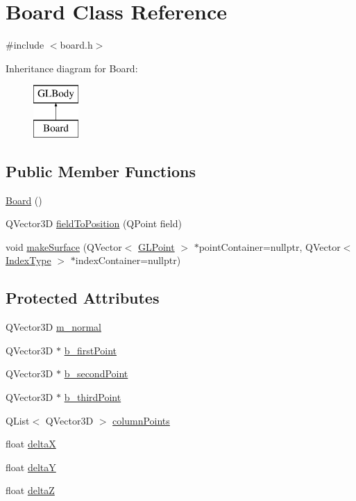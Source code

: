 \hypertarget{class_board}{}\section{Board Class Reference}
\label{class_board}


{\ttfamily \#include $<$board.\+h$>$}

Inheritance diagram for Board\+:\begin{figure}[H]
\begin{center}
\leavevmode
\includegraphics[height=2.000000cm]{class_board}
\end{center}
\end{figure}
\subsection*{Public Member Functions}
\begin{DoxyCompactItemize}
\item 
\mbox{\hyperlink{class_board_a9ee491d4fea680cf69b033374a9fdfcb}{Board}} ()
\item 
Q\+Vector3D \mbox{\hyperlink{class_board_a15ff6efe6bd967a60f6b12ce59e5c27a}{field\+To\+Position}} (Q\+Point field)
\item 
void \mbox{\hyperlink{class_board_a4a8568ce7d13db61b01e6bf14e7b12fd}{make\+Surface}} (Q\+Vector$<$ \mbox{\hyperlink{class_g_l_point}{G\+L\+Point}} $>$ $\ast$point\+Container=nullptr, Q\+Vector$<$ \mbox{\hyperlink{gldefines_8h_af3c748960f29c42e5b7f1dc449ab66ff}{Index\+Type}} $>$ $\ast$index\+Container=nullptr)
\end{DoxyCompactItemize}
\subsection*{Protected Attributes}
\begin{DoxyCompactItemize}
\item 
Q\+Vector3D \mbox{\hyperlink{class_board_ae13a36a59b726081033e3ffc158bb82a}{m\+\_\+normal}}
\item 
Q\+Vector3D $\ast$ \mbox{\hyperlink{class_board_ae2bd12894ff7340b865a463d600a2a49}{b\+\_\+first\+Point}}
\item 
Q\+Vector3D $\ast$ \mbox{\hyperlink{class_board_a24c40fa17f5e2e5ea5ffff433630c874}{b\+\_\+second\+Point}}
\item 
Q\+Vector3D $\ast$ \mbox{\hyperlink{class_board_a72cd2eef896165b445acfb5ea6c28de7}{b\+\_\+third\+Point}}
\item 
Q\+List$<$ Q\+Vector3D $>$ \mbox{\hyperlink{class_board_ab2d91193b052d9d05af44e62648cff41}{column\+Points}}
\item 
float \mbox{\hyperlink{class_board_acc78f2a614333d03e59d3008b841f164}{deltaX}}
\item 
float \mbox{\hyperlink{class_board_a44ba33a6896a37b3c18175b20fd6f3f6}{deltaY}}
\item 
float \mbox{\hyperlink{class_board_a86cfe659af51a4619e2b73bdbc1a9d1f}{deltaZ}}
\end{DoxyCompactItemize}
